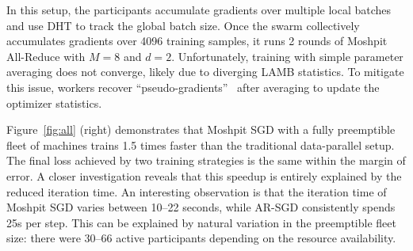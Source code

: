 In this setup, the participants accumulate gradients over multiple local batches and use DHT to track the global batch size. Once the swarm collectively accumulates gradients over 4096 training samples, it runs 2 rounds of Moshpit All-Reduce with $M{=}8$ and $d{=}2$. Unfortunately, training with simple parameter averaging does not converge, likely due to diverging LAMB statistics. To mitigate this issue, workers recover ``pseudo-gradients''~\cite{reddi2021adaptive,chen2020toward} after averaging to update the optimizer statistics.




Figure~\ref{fig:all} (right) demonstrates that Moshpit SGD with a fully preemptible fleet of machines trains 1.5 times faster than the traditional data-parallel setup.
The final loss achieved by two training strategies is the same within the margin of error.
A closer investigation reveals that this speedup is entirely explained by the reduced iteration time.
An interesting observation is that the iteration time of Moshpit SGD varies between {10--22} seconds, while AR-SGD consistently spends {25}s per step. This can be explained by natural variation in the preemptible fleet size: there were 30--66 active participants depending on the resource availability.
